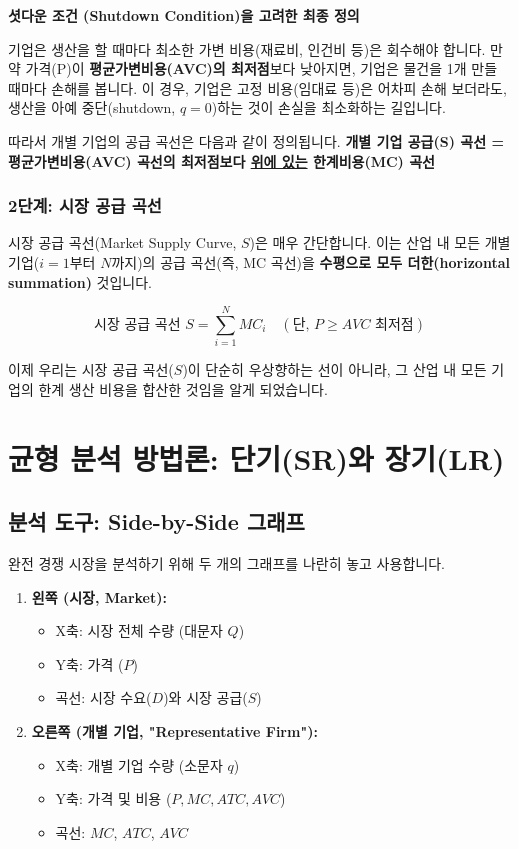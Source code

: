 \documentclass[11pt,a4paper]{article}
\theoremstyle{definition}
\begin{document}
\begin{warningbox}
\textbf{셧다운 조건 (Shutdown Condition)을 고려한 최종 정의}

기업은 생산을 할 때마다 최소한 가변 비용(재료비, 인건비 등)은 회수해야 합니다.
만약 가격(P)이 \textbf{평균가변비용(AVC)의 최저점}보다 낮아지면, 기업은 물건을 1개 만들 때마다 손해를 봅니다.
이 경우, 기업은 고정 비용(임대료 등)은 어차피 손해 보더라도, 생산을 아예 중단(shutdown, $q=0$)하는 것이 손실을 최소화하는 길입니다.

따라서 개별 기업의 공급 곡선은 다음과 같이 정의됩니다.
\textbf{개별 기업 공급(S) 곡선 = 평균가변비용(AVC) 곡선의 최저점보다 \underline{위에 있는} 한계비용(MC) 곡선}
\end{warningbox}

\subsubsection{2단계: 시장 공급 곡선}

시장 공급 곡선(Market Supply Curve, $S$)은 매우 간단합니다.
이는 산업 내 모든 개별 기업($i=1$부터 $N$까지)의 공급 곡선(즉, MC 곡선)을 \textbf{수평으로 모두 더한(horizontal summation)} 것입니다.

$$
\text{시장 공급 곡선 } S = \sum_{i=1}^{N} MC_i \quad (\text{단, } P \ge AVC \text{ 최저점})
$$

이제 우리는 시장 공급 곡선($S$)이 단순히 우상향하는 선이 아니라, 그 산업 내 모든 기업의 한계 생산 비용을 합산한 것임을 알게 되었습니다.

\newpage
\section{균형 분석 방법론: 단기(SR)와 장기(LR)}

\subsection{분석 도구: Side-by-Side 그래프}

완전 경쟁 시장을 분석하기 위해 두 개의 그래프를 나란히 놓고 사용합니다.

\begin{enumerate}
    \item \textbf{왼쪽 (시장, Market):}
    \begin{itemize}
        \item X축: 시장 전체 수량 (대문자 $Q$)
        \item Y축: 가격 ($P$)
        \item 곡선: 시장 수요($D$)와 시장 공급($S$)
    \end{itemize}
    \item \textbf{오른쪽 (개별 기업, "Representative Firm"):}
    \begin{itemize}
        \item X축: 개별 기업 수량 (소문자 $q$)
        \item Y축: 가격 및 비용 ($P, MC, ATC, AVC$)
        \item 곡선: $MC$, $ATC$, $AVC$
    \end{itemize}
\end{enumerate}
\end{document}
